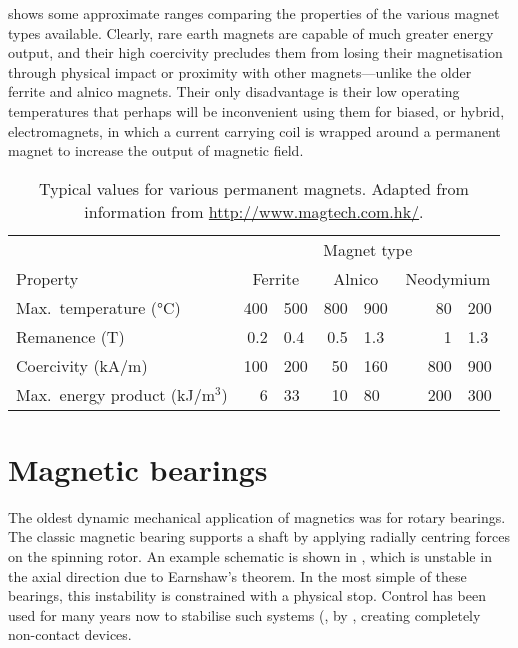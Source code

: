  shows some approximate ranges comparing the
properties of the various magnet types available. Clearly, rare earth
magnets are capable of much greater energy output, and their high
coercivity precludes them from losing their magnetisation through
physical impact or proximity with other magnets---unlike the older
ferrite and alnico magnets. Their only disadvantage is their low
operating temperatures that perhaps will be inconvenient using them
for biased, or hybrid, electromagnets, in which a current carrying
coil is wrapped around a permanent magnet to increase the output of
magnetic field.

\begin{table}
  \centering
  \begin{tabular}{@{} l r@{\,--\,}l r@{\,--\,}l r@{\,--\,}l @{}}
    \toprule
    & \multicolumn{6}{c}{Magnet type}\\
    \cmidrule{2-6}
    Property            & \multicolumn{2}{c}{Ferrite}   
                        & \multicolumn{2}{c}{Alnico}   
                        & \multicolumn{2}{c}{Neodymium}  \\
    \midrule
    Max.\ temperature (°C)    & 400 & 500 & 800 & 900 &     80 & 200  \\
    Remanence (T)             & 0.2 & 0.4 & 0.5 & 1.3 &      1 & 1.3  \\
    Coercivity (kA$/$m)       & 100 & 200 & 50  & 160 & ~~~800 & 900  \\
    Max.\ energy product 
                 (kJ$/$m$^3$) & 6   & 33  & 10  & 80  &    200 & 300  \\
    \bottomrule
  \end{tabular}
  \caption[Typical values for various permanent magnets.]
  {Typical values for various permanent magnets. 
   Adapted from information from \url{http://www.magtech.com.hk/}.}
\end{table}


\section{Magnetic bearings}

The oldest dynamic mechanical application of magnetics was for rotary
bearings.  The classic magnetic bearing supports a shaft by applying
radially centring forces on the spinning rotor. An example schematic
is shown in , which is unstable in the axial
direction due to Earnshaw's theorem. In the most simple of these
bearings, this instability is constrained with a physical stop.
Control has been used for many years now to stabilise such systems
(\eg, by \textcite{shimizu1968}, creating completely non-contact devices.

